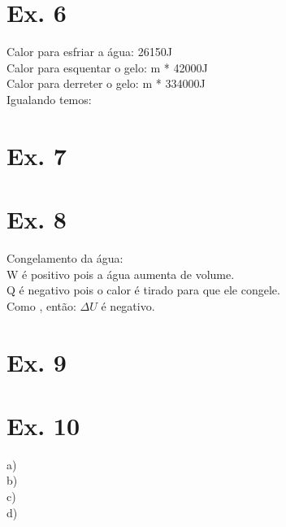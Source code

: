 \section{Ex. 6}
Calor para esfriar a água: 26150J\\
Calor para esquentar o gelo: m * 42000J\\
Calor para derreter o gelo: m * 334000J\\
Igualando temos:\\

\section{Ex. 7}

\section{Ex. 8}
Congelamento da água:\\
W é positivo pois a água aumenta de volume.\\
Q é negativo pois o calor é tirado para que ele congele.\\
Como , então: $\Delta U$ é negativo.

\section{Ex. 9}

\section{Ex. 10}
a) \\
b) \\
c) \\
d) 


